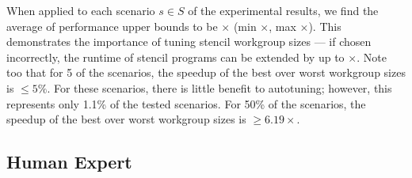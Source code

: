 When applied to each scenario $s \in S$ of the experimental results,
we find the average of performance upper bounds to be
$\times$ (min
$\times$, max
$\times$). This demonstrates the
importance of tuning stencil workgroup sizes --- if chosen
incorrectly, the runtime of stencil programs can be extended by up to
$\times$. Note too that for 5 of the
scenarios, the speedup of the best over worst workgroup sizes is
$\le 5\%$.
For these scenarios, there is little benefit to autotuning; however,
this represents only 1.1\% of the tested scenarios. For 50\% of the
scenarios, the speedup of the best over worst workgroup sizes is
$\ge 6.19\times$.


\subsection{Human Expert}

%

